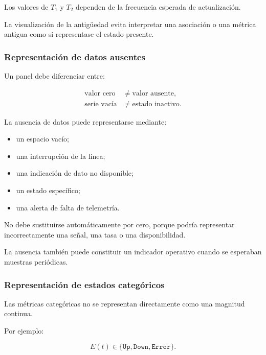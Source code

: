 Los valores de \(T_1\) y \(T_2\) dependen de la frecuencia esperada de
actualización.

La visualización de la antigüedad evita interpretar una asociación o una
métrica antigua como si representase el estado presente.


\subsubsection*{Representación de datos ausentes}

Un panel debe diferenciar entre:

\[
\begin{aligned}
    \text{valor cero}
    &\neq
    \text{valor ausente},\\
    \text{serie vacía}
    &\neq
    \text{estado inactivo}.
\end{aligned}
\]

La ausencia de datos puede representarse mediante:

\begin{itemize}
    \item un espacio vacío;

    \item una interrupción de la línea;

    \item una indicación de dato no disponible;

    \item un estado específico;

    \item una alerta de falta de telemetría.
\end{itemize}

No debe sustituirse automáticamente por cero, porque podría representar
incorrectamente una señal, una tasa o una disponibilidad.

La ausencia también puede constituir un indicador operativo cuando se
esperaban muestras periódicas.


\subsubsection*{Representación de estados categóricos}

Las métricas categóricas no se representan directamente como una
magnitud continua.

Por ejemplo:

\[
    E(t)
    \in
    \{
        \texttt{Up},
        \texttt{Down},
        \texttt{Error}
    \}.
\]

